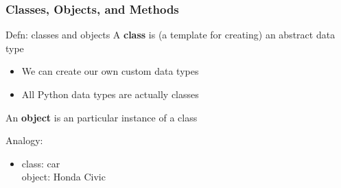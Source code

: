 \documentclass{beamer}
\begin{document}
\begin{frame}	
	\frametitle{Classes, Objects, and Methods}
	
	\begin{alertblock}{Defn: classes and objects}
		A \textbf{class} is (a template for creating) an abstract data type
		\begin{itemize}
			\item We can create our own custom data types
			\item All Python data types are actually classes
		\end{itemize}
		An \textbf{object} is an particular instance of a class
		
		\vspace{10pt}
		Analogy:
		\begin{itemize}
			\item class: car \\
					object: Honda Civic
		\end{itemize}
	\end{alertblock}
	
\end{frame}
\end{document}
